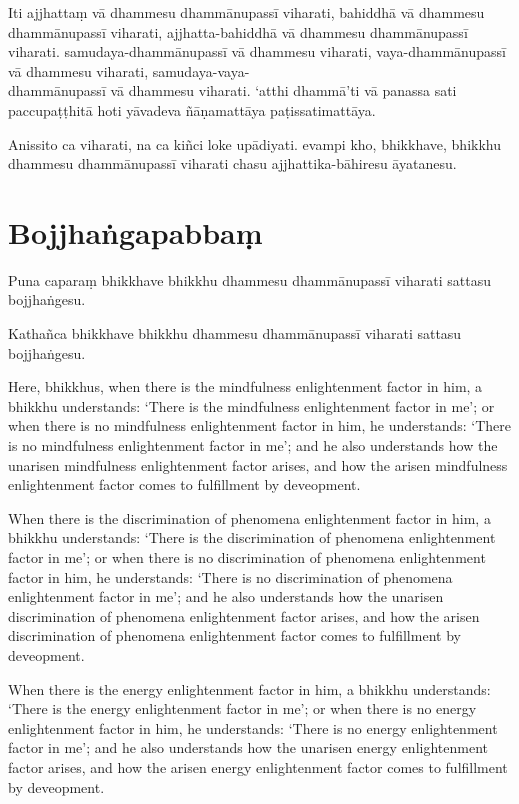 Iti ajjhattaṃ vā dhammesu dhammānupassī viharati,
bahiddhā vā dhammesu dhammānupassī viharati,
ajjhatta-bahiddhā vā dhammesu dhammānupassī viharati.
samudaya-dhammānupassī vā dhammesu viharati,
vaya-dhammānupassī vā dhammesu viharati,
samudaya-vaya-\\ dhammānupassī vā dhammesu viharati.
‘atthi dhammā’ti vā panassa sati paccupaṭṭhitā hoti
yāvadeva ñāṇamattāya paṭissatimattāya.

Anissito ca viharati, na ca kiñci loke upādiyati. evampi kho, bhikkhave, bhikkhu
dhammesu dhammānupassī viharati chasu ajjhattika-bāhiresu āyatanesu.


\section*{Bojjhaṅgapabbaṃ}

Puna caparaṃ bhikkhave bhikkhu dhammesu dhammānupassī viharati sattasu
bojjhaṅgesu.

Kathañca bhikkhave bhikkhu dhammesu dhammānupassī viharati sattasu bojjhaṅgesu.

\englishPage

Here, bhikkhus, when there is the mindfulness enlightenment factor in him, a
bhikkhu understands: `There is the mindfulness enlightenment factor in me'; or
when there is no mindfulness enlightenment factor in him, he understands: `There
is no mindfulness enlightenment factor in me'; and he also understands how the
unarisen mindfulness enlightenment factor arises, and how the arisen mindfulness
enlightenment factor comes to fulfillment by deveopment.

When there is the discrimination of phenomena enlightenment factor in him, a
bhikkhu understands: `There is the discrimination of phenomena enlightenment
factor in me'; or when there is no discrimination of phenomena enlightenment
factor in him, he understands: `There is no discrimination of phenomena
enlightenment factor in me'; and he also understands how the unarisen
discrimination of phenomena enlightenment factor arises, and how the arisen
discrimination of phenomena enlightenment factor comes to fulfillment by
deveopment.

When there is the energy enlightenment factor in him, a bhikkhu understands:
`There is the energy enlightenment factor in me'; or when there is no energy
enlightenment factor in him, he understands: `There is no energy enlightenment
factor in me'; and he also understands how the unarisen energy enlightenment
factor arises, and how the arisen energy enlightenment factor comes to
fulfillment by deveopment.

